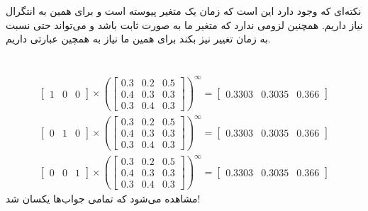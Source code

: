 \documentclass[]{article}
\begin{document}
\section{}
نکته‌ای که وجود دارد این است که زمان یک متغیر پیوسته است و برای همین به انتگرال نیاز داریم. همچنین لزومی
ندارد که متغیر ما به صورت ثابت باشد و می‌تواند حتی نسبت به زمان تغییر نیز بکند برای همین ما نیاز
به همچین عبارتی داریم.

\section{}
\begin{gather*}
    \begin{bmatrix}
        1 & 0 & 0
    \end{bmatrix}
    \times
    \left(
        \begin{bmatrix}
            0.3 & 0.2 & 0.5\\
            0.4 & 0.3 & 0.3\\
            0.3 & 0.4 & 0.3
        \end{bmatrix}
    \right)^\infty
    =
    \begin{bmatrix}
        0.3303 & 0.3035 & 0.366
    \end{bmatrix}\\
    \begin{bmatrix}
        0 & 1 & 0
    \end{bmatrix}
    \times
    \left(
        \begin{bmatrix}
            0.3 & 0.2 & 0.5\\
            0.4 & 0.3 & 0.3\\
            0.3 & 0.4 & 0.3
        \end{bmatrix}
    \right)^\infty
    =
    \begin{bmatrix}
        0.3303 & 0.3035 & 0.366
    \end{bmatrix}\\
    \begin{bmatrix}
        0 & 0 & 1
    \end{bmatrix}
    \times
    \left(
        \begin{bmatrix}
            0.3 & 0.2 & 0.5\\
            0.4 & 0.3 & 0.3\\
            0.3 & 0.4 & 0.3
        \end{bmatrix}
    \right)^\infty
    =
    \begin{bmatrix}
        0.3303 & 0.3035 & 0.366
    \end{bmatrix}
\end{gather*}
مشاهده می‌شود که تمامی جواب‌ها یکسان شد!

\section{}
\end{document}
